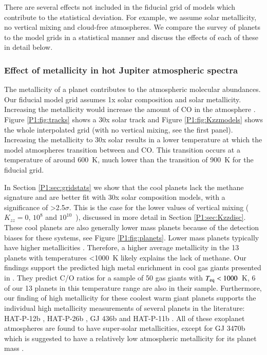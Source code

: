 There are several effects not included in the fiducial grid of models which contribute to the statistical deviation. For example, we assume solar metallicity, no vertical mixing and cloud-free atmospheres. We compare the survey of planets to the model grids in a statistical manner and discuss the effects of each of these in detail below.

\subsubsection{Effect of metallicity in hot Jupiter atmospheric spectra}
\label{P1:sec:metallicitydisc}

The metallicity of a planet contributes to the atmospheric molecular abundances. Our fiducial model grid assumes 1x solar composition and solar metallicity. Increasing the metallicity would increase the amount of CO in the atmosphere \citep[e.g.,][]{Venot2014}. Figure \ref{P1:fig:tracks} shows a 30x solar track and Figure \ref{P1:fig:Kzzmodels} shows the whole interpolated grid (with no vertical mixing, see the first panel). Increasing the metallicity to 30x solar results in a lower temperature at which the model atmospheres transition between  and CO. This transition occurs at a temperature of around 600~K, much lower than the transition of 900~K for the fiducial grid.

In Section \ref{P1:sec:gridstats} we show that the cool planets lack the methane signature and are better fit with 30x solar composition models, with a significance of >2.5$\sigma$. This is the case for the lower values of vertical mixing ($K_{zz} = 0$,  $10^8$ and $10^{10}$~\cmcms), discussed in more detail in Section \ref{P1:sec:Kzzdisc}. These cool planets are also generally lower mass planets because of the detection biases for these systems, see Figure \ref{P1:fig:planets}. Lower mass planets typically have higher metallicities \cite{Fortney2013, Welbanks2019}. Therefore, a higher average metallicity in the 13 planets with temperatures <1000~K likely explains the lack of methane. Our findings support the predicted high metal enrichment in cool gas giants presented in \citet{Espinoza2017}. They predict C/O ratios for a sample of 50 gas giants with $T_{\rm eq}<1000$~K, 6 of our 13 planets in this temperature range are also in their sample. Furthermore, our finding of high metallicity for these coolest warm giant planets supports the individual high metallicity measurements of several planets in the literature: HAT-P-12b \citep{Line2013b}, HAT-P-26b \citep{Wakeford2017}, GJ 436b \citep{Morley2017} and HAT-P-11b \citep{Mansfield2018b}.  All of these exoplanet atmospheres are found to have super-solar metallicities, except for GJ 3470b which is suggested to have a relatively low atmospheric metallicity for its planet mass \citep{Benneke2019}.


